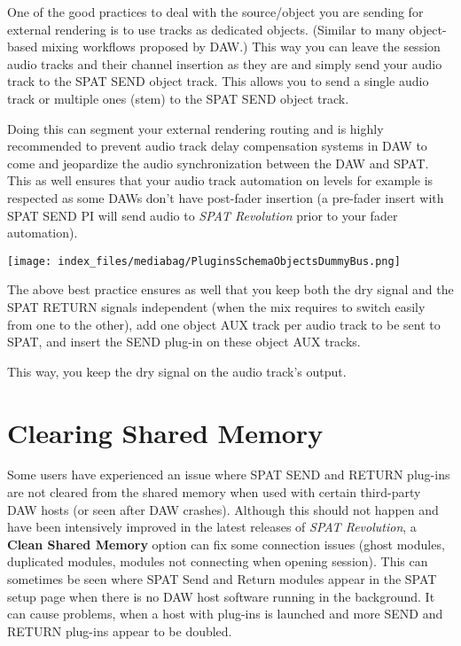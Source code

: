 \documentclass[
  letterpaper,
  DIV=11,
  numbers=noendperiod]{scrreport}
\begin{document}
One of the good practices to deal with the source/object you are sending
for external rendering is to use tracks as dedicated objects. (Similar
to many object-based mixing workflows proposed by DAW.) This way you can
leave the session audio tracks and their channel insertion as they are
and simply send your audio track to the SPAT SEND object track. This
allows you to send a single audio track or multiple ones (stem) to the
SPAT SEND object track.

Doing this can segment your external rendering routing and is highly
recommended to prevent audio track delay compensation systems in DAW to
come and jeopardize the audio synchronization between the DAW and SPAT.
This as well ensures that your audio track automation on levels for
example is respected as some DAWs don't have post-fader insertion (a
pre-fader insert with SPAT SEND PI will send audio to \emph{SPAT
Revolution} prior to your fader automation).

\texttt{[image: index\_files/mediabag/PluginsSchemaObjectsDummyBus.png]}

The above best practice ensures as well that you keep both the dry
signal and the SPAT RETURN signals independent (when the mix requires to
switch easily from one to the other), add one object AUX track per audio
track to be sent to SPAT, and insert the SEND plug-in on these object
AUX tracks.

This way, you keep the dry signal on the audio track's output.

\hypertarget{clearing-shared-memory}{%
\section{Clearing Shared Memory}\label{clearing-shared-memory}}

Some users have experienced an issue where SPAT SEND and RETURN plug-ins
are not cleared from the shared memory when used with certain
third-party DAW hosts (or seen after DAW crashes). Although this should
not happen and have been intensively improved in the latest releases of
\emph{SPAT Revolution}, a \textbf{Clean Shared Memory} option can fix
some connection issues (ghost modules, duplicated modules, modules not
connecting when opening session). This can sometimes be seen where SPAT
Send and Return modules appear in the SPAT setup page when there is no
DAW host software running in the background. It can cause problems, when
a host with plug-ins is launched and more SEND and RETURN plug-ins
appear to be doubled.
\end{document}
